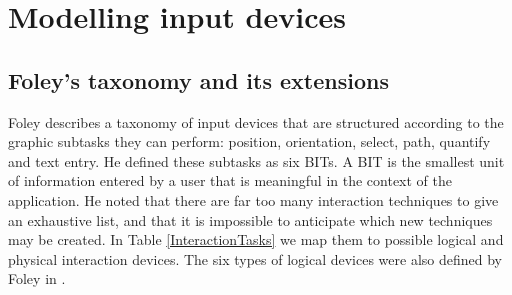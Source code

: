 % 
% 
% 
% 
% 

	
\section{Modelling input devices} 
\label{interactionTasks}

\subsection{Foley's taxonomy and its extensions}
	
	Foley \cite{Foley1984} describes a taxonomy of input devices that are structured according to the graphic subtasks they can perform: position, orientation, select, path, quantify and text entry. He defined these subtasks as six \acp{BIT}. A \ac{BIT} is the smallest unit of information entered by a user that is meaningful in the context of the application. He noted that there are far too many interaction techniques to give an exhaustive list, and that it is impossible to anticipate which new techniques may be created. In Table \ref{InteractionTasks} we map them to possible logical and physical interaction devices. The six types of logical devices were also defined by Foley in \cite{Foley1996}.
	
